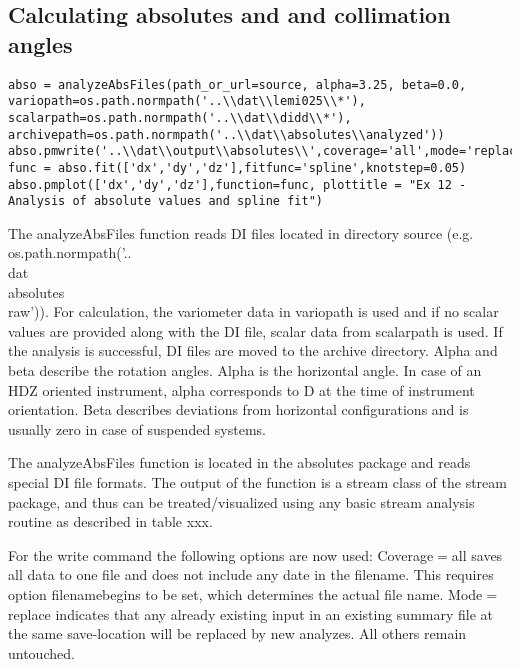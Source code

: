 \subsection{Calculating absolutes and and collimation angles}

\begin{verbatim}
abso = analyzeAbsFiles(path_or_url=source, alpha=3.25, beta=0.0, variopath=os.path.normpath('..\\dat\\lemi025\\*'), scalarpath=os.path.normpath('..\\dat\\didd\\*'), archivepath=os.path.normpath('..\\dat\\absolutes\\analyzed'))
abso.pmwrite('..\\dat\\output\\absolutes\\',coverage='all',mode='replace',filenamebegins='absolutes_lemi')
func = abso.fit(['dx','dy','dz'],fitfunc='spline',knotstep=0.05)
abso.pmplot(['dx','dy','dz'],function=func, plottitle = "Ex 12 - Analysis of absolute values and spline fit")
\end{verbatim}
The analyzeAbsFiles function reads DI files located in directory source (e.g. os.path.normpath('..\\dat\\absolutes\\raw')). For calculation, the variometer data in variopath is used and if no scalar values are provided along with the DI file, scalar data from scalarpath is used. If the analysis is successful, DI files are moved to the archive directory. Alpha and beta describe the rotation angles. Alpha is the horizontal angle. In case of an HDZ oriented instrument, alpha corresponds to D at the time of instrument orientation. Beta describes deviations from horizontal configurations and is usually zero in case of suspended systems.

The analyzeAbsFiles function is located in the absolutes package and reads special DI file formats. The output of the function is a stream class of the stream package, and thus can be treated/visualized using any basic stream analysis routine as described in table xxx.

For the write command the following options are now used: Coverage$=$all saves all data to one file and does not include any date in the filename. This requires option filenamebegins to be set, which determines the actual file name. Mode$=$replace indicates that any already existing input in an existing summary file at the same save-location will be replaced by new analyzes. All others remain untouched.


